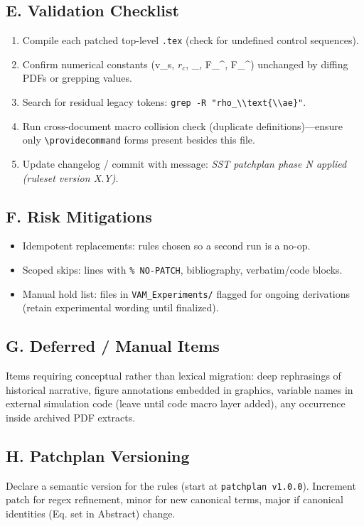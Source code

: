 \documentclass[11pt]{article}
\newcommand{\vscore}{v_s}                                %
\newcommand{\rhoC}{\rho_{\mathrm{core}}} %
\newcommand{\FmaxEM}{F_{\mathrm{EM}}^{\max}}             %
\newcommand{\FmaxG}{F_{\mathrm{G}}^{\max}}               %
\begin{document}
\subsection*{E. Validation Checklist}
\begin{enumerate}
  \item Compile each patched top-level \texttt{.tex} (check for undefined control sequences).\label{val:compile}
  \item Confirm numerical constants (\vscore, $r_c$, \rhoC, \FmaxEM, \FmaxG) unchanged by diffing PDFs or grepping values.
  \item Search for residual legacy tokens: \verb|grep -R "rho_\\text{\\ae}"|.
  \item Run cross-document macro collision check (duplicate definitions)---ensure only \verb|\providecommand| forms present besides this file.
  \item Update changelog / commit with message: \emph{SST patchplan phase N applied (ruleset version X.Y)}.
\end{enumerate}

\subsection*{F. Risk Mitigations}
\begin{itemize}
  \item Idempotent replacements: rules chosen so a second run is a no-op.
  \item Scoped skips: lines with \verb|% NO-PATCH|, bibliography, verbatim/code blocks.
  \item Manual hold list: files in \texttt{VAM\_Experiments/} flagged for ongoing derivations (retain experimental wording until finalized).
\end{itemize}

\subsection*{G. Deferred / Manual Items}
Items requiring conceptual rather than lexical migration: deep rephrasings of historical narrative, figure annotations embedded in graphics, variable names in external simulation code (leave until code macro layer added), any occurrence inside archived PDF extracts.

\subsection*{H. Patchplan Versioning}
Declare a semantic version for the rules (start at \verb|patchplan v1.0.0|). Increment patch for regex refinement, minor for new canonical terms, major if canonical identities (Eq. set in Abstract) change.
\end{document}
